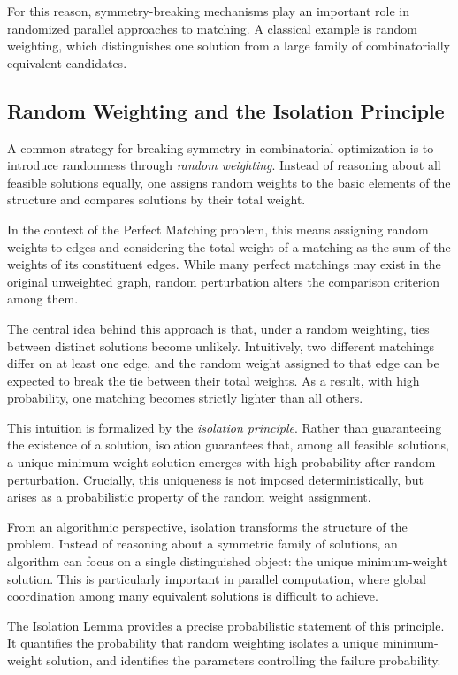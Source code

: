 For this reason, symmetry-breaking mechanisms play an important role in randomized parallel approaches to matching.
A classical example is random weighting, which distinguishes one solution from a large family of combinatorially equivalent candidates.

\subsection{Random Weighting and the Isolation Principle}

A common strategy for breaking symmetry in combinatorial optimization is to introduce randomness through \emph{random weighting}.
Instead of reasoning about all feasible solutions equally, one assigns random weights to the basic elements of the structure and compares solutions by their total weight.

In the context of the Perfect Matching problem, this means assigning random weights to edges and considering the total weight of a matching as the sum of the weights of its constituent edges.
While many perfect matchings may exist in the original unweighted graph, random perturbation alters the comparison criterion among them.

The central idea behind this approach is that, under a random weighting, ties between distinct solutions become unlikely.
Intuitively, two different matchings differ on at least one edge, and the random weight assigned to that edge can be expected to break the tie between their total weights.
As a result, with high probability, one matching becomes strictly lighter than all others.

This intuition is formalized by the \emph{isolation principle}.
Rather than guaranteeing the existence of a solution, isolation guarantees that, among all feasible solutions, a unique minimum-weight solution emerges with high probability after random perturbation.
Crucially, this uniqueness is not imposed deterministically, but arises as a probabilistic property of the random weight assignment.

From an algorithmic perspective, isolation transforms the structure of the problem.
Instead of reasoning about a symmetric family of solutions, an algorithm can focus on a single distinguished object: the unique minimum-weight solution.
This is particularly important in parallel computation, where global coordination among many equivalent solutions is difficult to achieve.

The Isolation Lemma provides a precise probabilistic statement of this principle.
It quantifies the probability that random weighting isolates a unique minimum-weight solution, and identifies the parameters controlling the failure probability.

